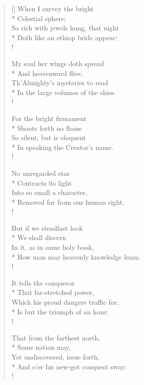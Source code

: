 \documentclass[MAIN]{subfiles}
\begin{document}
\settowidth{\versewidth}{So rich with jewels hung, that night}
\begin{verse}[\versewidth]
\vin When I survey the bright\\*
\vin \vin Celestial sphere;\\
So rich with jewels hung, that night\\*
Doth like an ethiop bride appear:\\!

\vin My soul her wings doth spread\\*
\vin \vin And heavenward flies,\\
Th'Almighty's mysteries to read\\*
In the large volumes of the skies.\\!

\vin For the bright firmament\\*
\vin \vin Shoots forth no flame\\
So silent, but is eloquent\\*
In speaking the Creator's name.\\!

\vin No unregarded star\\*
\vin \vin Contracts its light\\
Into so small a character,\\*
Removed far from our human sight,\\!

\vin But if we steadfast look\\*
\vin \vin We shall discern\\
In it, as in some holy book,\\*
How man may heavenly knowledge learn.\\!

\vin It tells the conqueror\\*
\vin \vin That far-stretched power,\\
Which his proud dangers traffic for,\\*
Is but the triumph of an hour:\\!

\vin That from the farthest north,\\*
\vin \vin Some nation may,\\
Yet undiscovered, issue forth,\\*
And o'er his new-got conquest sway:\\!


\end{verse}
\end{document}
